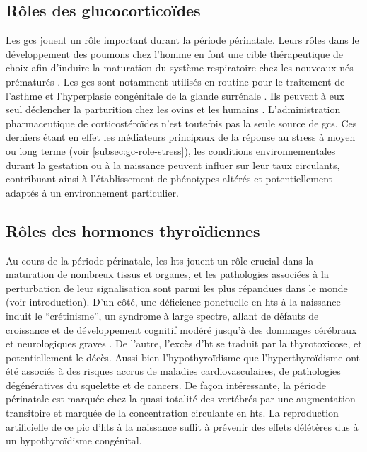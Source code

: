 \documentclass[../main.tex]{subfiles}
\begin{document}

	\subsection{Rôles des glucocorticoïdes}
		Les \glspl{gc} jouent un rôle important durant la période périnatale.
		Leurs rôles dans le développement des poumons chez l'homme en font une cible thérapeutique de choix afin d'induire la maturation du système respiratoire chez les nouveaux nés prématurés \citep{NGC2010}.
		Les \glspl{gc} sont notamment utilisés en routine pour le traitement de l'asthme \citep{Clifton2005,Osei-Kumah2011} et l'hyperplasie congénitale de la glande surrénale \citep{Forest2004}.
		Ils peuvent à eux seul déclencher la parturition chez les ovins et les humains \citep{Mati1973,Whittle2001}.
		L’administration pharmaceutique de corticostéroïdes n'est toutefois pas la seule source de \glspl{gc}.
		Ces derniers étant en effet les médiateurs principaux de la réponse au stress à moyen ou long terme (voir \autoref{subsec:gc-role-stress}), les conditions environnementales durant la gestation ou à la naissance peuvent influer sur leur taux circulants, contribuant ainsi à l'établissement de phénotypes altérés et potentiellement adaptés à un environnement particulier.


	\subsection{Rôles des hormones thyroïdiennes}
		Au cours de la période périnatale, les \glspl{ht} jouent un rôle crucial dans la maturation de nombreux tissus et organes, et les pathologies associées à la perturbation de leur signalisation sont parmi les plus répandues dans le monde (voir introduction).
		D'un côté, une déficience ponctuelle en \glspl{ht} à la naissance induit le ``crétinisme'', un syndrome à large spectre, allant de défauts de croissance et de développement cognitif modéré jusqu'à des dommages cérébraux et neurologiques graves \citep{Delange1994,Chen2010}.
		De l'autre, l'excès d'\gls{ht} se traduit par la thyrotoxicose, et potentiellement le décès.
		Aussi bien l'hypothyroïdisme que l'hyperthyroïdisme ont été associés à des risques accrus de maladies cardiovasculaires, de pathologies dégénératives du squelette et de cancers.
		De façon intéressante, la période périnatale est marquée chez la quasi-totalité des vertébrés par une augmentation transitoire et marquée de la concentration circulante en \glspl{ht}.
		La reproduction artificielle de ce pic d'\glspl{ht} à la naissance suffit à prévenir des effets délétères dus à un hypothyroïdisme congénital.
\end{document}
